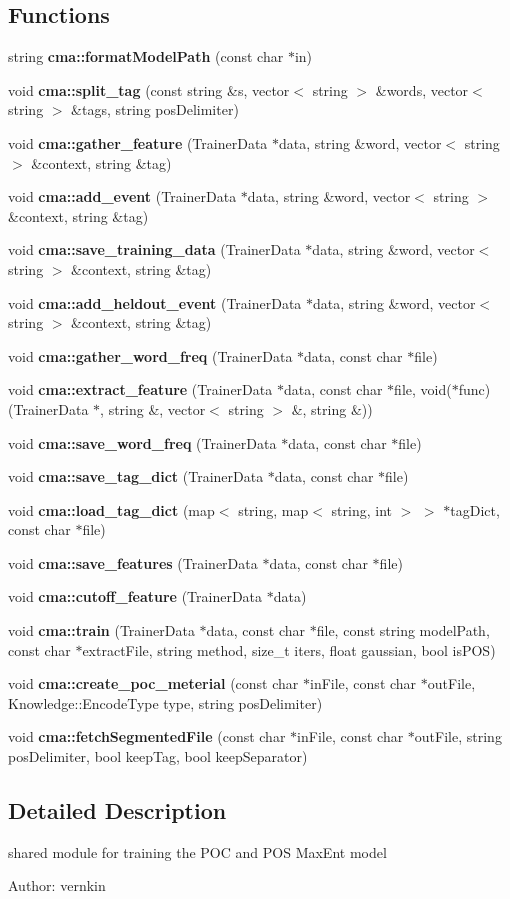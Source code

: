 \subsection*{Functions}
\begin{CompactItemize}
\item 
string {\bf cma::formatModelPath} (const char $\ast$in)
\item 
void {\bf cma::split\_\-tag} (const string \&s, vector$<$ string $>$ \&words, vector$<$ string $>$ \&tags, string posDelimiter)
\item 
void {\bf cma::gather\_\-feature} (TrainerData $\ast$data, string \&word, vector$<$ string $>$ \&context, string \&tag)
\item 
void {\bf cma::add\_\-event} (TrainerData $\ast$data, string \&word, vector$<$ string $>$ \&context, string \&tag)
\item 
void {\bf cma::save\_\-training\_\-data} (TrainerData $\ast$data, string \&word, vector$<$ string $>$ \&context, string \&tag)
\item 
void {\bf cma::add\_\-heldout\_\-event} (TrainerData $\ast$data, string \&word, vector$<$ string $>$ \&context, string \&tag)
\item 
void {\bf cma::gather\_\-word\_\-freq} (TrainerData $\ast$data, const char $\ast$file)
\item 
void {\bf cma::extract\_\-feature} (TrainerData $\ast$data, const char $\ast$file, void($\ast$func)(TrainerData $\ast$, string \&, vector$<$ string $>$ \&, string \&))
\item 
void {\bf cma::save\_\-word\_\-freq} (TrainerData $\ast$data, const char $\ast$file)
\item 
void {\bf cma::save\_\-tag\_\-dict} (TrainerData $\ast$data, const char $\ast$file)
\item 
void {\bf cma::load\_\-tag\_\-dict} (map$<$ string, map$<$ string, int $>$ $>$ $\ast$tagDict, const char $\ast$file)
\item 
void {\bf cma::save\_\-features} (TrainerData $\ast$data, const char $\ast$file)
\item 
void {\bf cma::cutoff\_\-feature} (TrainerData $\ast$data)
\item 
void {\bf cma::train} (TrainerData $\ast$data, const char $\ast$file, const string modelPath, const char $\ast$extractFile, string method, size\_\-t iters, float gaussian, bool isPOS)
\item 
void {\bf cma::create\_\-poc\_\-meterial} (const char $\ast$inFile, const char $\ast$outFile, Knowledge::EncodeType type, string posDelimiter)
\item 
void {\bf cma::fetchSegmentedFile} (const char $\ast$inFile, const char $\ast$outFile, string posDelimiter, bool keepTag, bool keepSeparator)
\end{CompactItemize}


\subsection{Detailed Description}
shared module for training the POC and POS MaxEnt model 

\begin{Desc}
\item[Author:]vernkin \end{Desc}
